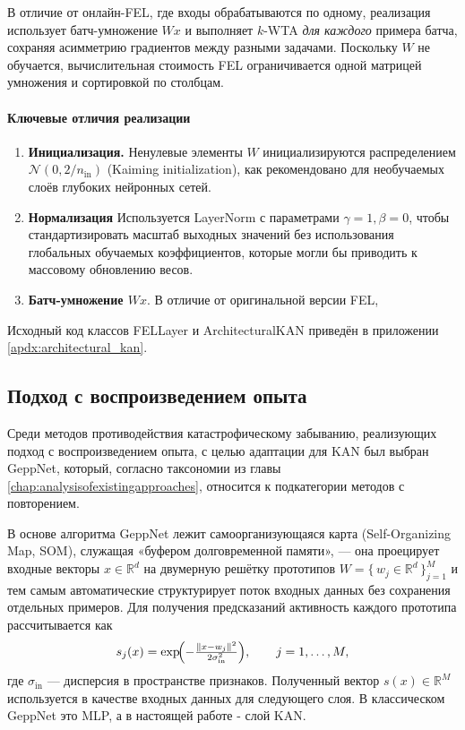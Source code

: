 \documentclass[a4paper,14pt]{extarticle}
\begin{document}
В отличие от онлайн-FEL, где входы обрабатываются по одному,
реализация использует батч-умножение $Wx$ и выполняет
$k$-WTA \emph{для каждого} примера батча, сохраняя
асимметрию градиентов между разными задачами.
Поскольку $W$ не обучается, вычислительная стоимость FEL
ограничивается одной матрицей умножения и сортировкой по столбцам.
\paragraph{Ключевые отличия реализации}
\begin{enumerate}
    \item \textbf{Инициализация.}  
        Ненулевые элементы \(W\) инициализируются распределением 
        \(\mathcal{N}(0,2/n_\text{in})\) (Kaiming initialization), как
        рекомендовано для необучаемых слоёв глубоких нейронных сетей.
    \item \textbf{Нормализация}  
        Используется LayerNorm с параметрами \(\gamma\!=\!1,\beta\!=\!0\),
        чтобы стандартизировать масштаб выходных значений без использования
        глобальных обучаемых коэффициентов, которые могли бы приводить к
        массовому обновлению весов.
    \item \textbf{Батч-умножение \(Wx\)}. В отличие от оригинальной версии FEL,
        
\end{enumerate}

Исходный код классов FELLayer и ArchitecturalKAN приведён в приложении
\ref{apdx:architectural_kan}.
\subsection{Подход с воспроизведением опыта}
Среди методов противодействия катастрофическому забыванию, реализующих подход с
воспроизведением опыта, с целью адаптации для KAN был выбран GeppNet, который,
согласно таксономии из главы \ref{chap:analysisofexistingapproaches}, относится
к подкатегории методов с повторением.

В основе алгоритма GeppNet лежит самоорганизующаяся карта
(Self-Organizing Map, SOM), служащая «буфером долговременной памяти», —
она проецирует входные векторы \(x\!\in\!\mathbb{R}^{d}\) на
двумерную решётку прототипов \(W=\{\,w_{j}\in\mathbb{R}^{d}\,\}_{j=1}^{M}\) и
тем самым автоматические структурирует поток входных данных без сохранения
отдельных примеров.
Для получения предсказаний активность каждого прототипа рассчитывается как
\begin{equation}
    s_{j}(x)=
    \exp\!\Bigl(-\tfrac{\lVert x-w_{j}\rVert^{2}}{2\sigma_{\text{in}}^{2}}\Bigr),
    \qquad
    j=1,\dots ,M,
    \label{eq:som_similarity}
\end{equation}
где \(\sigma_{\text{in}}\) — дисперсия в пространстве признаков. Полученный
вектор \(s(x)\in\mathbb{R}^{M}\) используется в качестве входных данных для
следующего слоя. В классическом GeppNet это MLP, а в настоящей работе - слой KAN.
\end{document}
